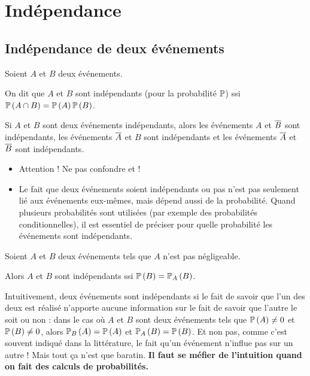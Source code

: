 \section{Indépendance}

\subsection{Indépendance de deux événements}

\begin{defi}
Soient \(A\) et \(B\) deux événements.

On dit que \(A\) et \(B\) sont indépendants (pour la probabilité \(\prem\)) ssi \(\proba{A\inter B}=\proba{A}\proba{B}\).
\end{defi}

\begin{prop}
Si \(A\) et \(B\) sont deux événements indépendants, alors les événements \(A\) et \(\conj{B}\) sont indépendants, les événements \(\conj{A}\) et \(B\) sont indépendants et les événements \(\conj{A}\) et \(\conj{B}\) sont indépendants.
\end{prop}

\begin{rem}
\begin{itemize}
    \item Attention ! Ne pas confondre  et  ! \\
    \item Le fait que deux événements soient indépendants ou pas n'est pas seulement lié aux événements eux-mêmes, mais dépend aussi de la probabilité. Quand plusieurs probabilités sont utilisées (par exemple des probabilités conditionnelles), il est essentiel de préciser pour quelle probabilité les événements sont indépendants.
\end{itemize}
\end{rem}

\begin{prop}
Soient \(A\) et \(B\) deux événements tels que \(A\) n'est pas négligeable.

Alors \(A\) et \(B\) sont indépendants ssi \(\proba{B}=\probacond{B}{A}\).
\end{prop}

Intuitivement, deux événements sont indépendants si le fait de savoir que l'un des deux est réalisé n'apporte aucune information sur le fait de savoir que l'autre le soit ou non : dans le cas où \(A\) et \(B\) sont deux événements tels que \(\proba{A}\not=0\) et \(\proba{B}\not=0\), alors \(\probacond{A}{B}=\proba{A}\) et \(\probacond{B}{A}=\proba{B}\). Et non pas, comme c'est souvent indiqué dans la littérature, le fait qu'un événement n'influe pas sur un autre ! Mais tout ça n'est que baratin. \textbf{Il faut se méfier de l'intuition quand on fait des calculs de probabilités.}

